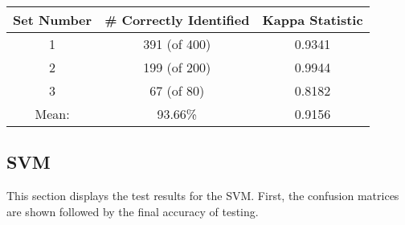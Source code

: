 \documentclass{article}
\begin{document}
				\begin{minipage}{\linewidth}
					\centering
					\begin{tabular}{c|cc}\label{MLPAcc}
						Set Number 	& \# Correctly Identified	& Kappa Statistic \\
						\hline
						1			&  391 (of 400)		 		&	0.9341					 \\
						2			&  199 (of 200)		 		&	0.9944				 \\ 
						3			&  67 (of 80)		 		&	0.8182					 \\
						\hline
						Mean: &93.66\% &0.9156
					\end{tabular}
				\end{minipage}
				
		\subsection{SVM}
		This section displays the test results for the SVM. First, the confusion matrices are shown followed by the final accuracy of testing.
		
\end{document}
